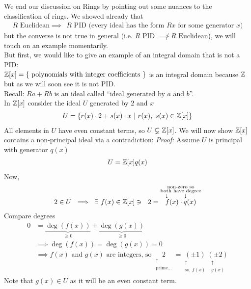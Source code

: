 We end our discussion on Rings by pointing out some nuances to the classification of rings. We showed already that 
\begin{align*}
    R \text{ Euclidean} \implies \ \ R \text{ PID (every ideal has the form $Rx$ for some generator $x$)}
\end{align*}
but the converse is not true in general (i.e. $R \text{ PID }\not \implies R \text{ Euclidean}$), we will touch on an example momentarily. \\ 

But first, we would like to give an example of an integral domain that is not a PID: \\
${\mathbb{ Z}}[x]=\{\text{ polynomials with integer coefficients }\}$ is an integral domain because ${\mathbb{ Z}}$ but as we will soon see it is not PID. \\
Recall: $Ra+Rb$ is an ideal called ``ideal generated by $a$ and $b$''. \\
In ${\mathbb{ Z}}[x]$ consider the ideal $U$ generated by $2$ and $x$
\begin{align*}
    U=\{r(x)\cdot 2 + s(x)\cdot x \ | \ r(x), \ s(x)\in {\mathbb{ Z}}[x]\}
\end{align*}
All elements in $U$ have even constant terms, so $U\varsubsetneq {\mathbb{ Z}}[x]$. We will now show ${\mathbb{ Z}}[x]$ contains a non-principal ideal via a contradiction:
\textit{Proof: } Assume $U$ is principal with generator $q(x)$
\begin{align*}
    U={\mathbb{ Z}}[x]q(x)
\end{align*}
Now, 
\begin{align*}
    2\in U \ \implies \ \exists \ f(x) \in \Z[x] \ni \ \ 2=\overset{\substack{\text{ non-zero so } \\ \text{both have degree} \\ \downarrow \ \ \ \ \ \ \  \downarrow \ \ \ \ }}{f(x) \cdot q(x)}
\end{align*}
Compare degrees
\begin{align*}
    0 &= \underbrace{\deg(f(x))}_{\geq 0}+\underbrace{\deg(g(x))}_{\geq 0} \\
    &\implies \deg(f(x))=\deg(g(x))=0 \\
    &\implies f(x) \text{ and }g(x) \text{ are integers, so } \underset{\substack{\uparrow \\ \text{prime...}}}{2}=\underset{\substack{\uparrow \\ \text{so, } f(x)}}{(\pm 1)}\underset{\substack{\uparrow \\ g(x)}}{(\pm 2)}
\end{align*}
Note that $g(x)\in U$ as it will be an even constant term. \\ \steezybreak
